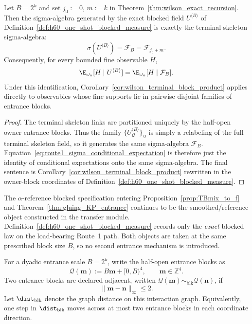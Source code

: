 \begin{proposition}
\label{prop:route1_blocked_sigma_identification}
Let $B=2^k$ and set $j_0:=0$, $m:=k$ in Theorem~\ref{thm:wilson_exact_recursion}.
Then the sigma-algebra generated by the exact blocked field $U^{\langle B\rangle}$ of Definition~\ref{def:h60_one_shot_blocked_measure} is exactly the terminal skeleton sigma-algebra:
\[
\sigma(U^{\langle B\rangle})=\mathcal F_B=\mathcal F_{j_0+m}.
\]
Consequently, for every bounded fine observable $H$,
\begin{equation}\label{eq:route1_sigma_conditional_expectation}
\E_{\omega_a}[H\mid U^{\langle B\rangle}]
=
\E_{\omega_a}[H\mid \mathcal F_B].
\end{equation}
Under this identification, Corollary~\ref{cor:wilson_terminal_block_product} applies directly to observables whose fine supports lie in pairwise disjoint families of entrance blocks.
\end{proposition}

\begin{proof}
The terminal skeleton links are partitioned uniquely by the half-open owner entrance blocks.
Thus the family $\{U^{\langle B\rangle}_{\mathcal Q}\}_{\mathcal Q}$ is simply a relabeling of the full terminal skeleton field, so it generates the same sigma-algebra $\mathcal F_B$.
Equation~\eqref{eq:route1_sigma_conditional_expectation} is therefore just the identity of conditional expectations onto the same sigma-algebra.
The final sentence is Corollary~\ref{cor:wilson_terminal_block_product} rewritten in the owner-block coordinates of Definition~\ref{def:h60_one_shot_blocked_measure}.
\end{proof}

\begin{remark}
The $\alpha$-reference blocked specification entering Proposition~\ref{prop:TBmix_to_f} and Theorem~\ref{thm:gluing_KP_entrance} continues to be the smoothed/reference object constructed in the transfer module.
Definition~\ref{def:h60_one_shot_blocked_measure} records only the \emph{exact} blocked law on the load-bearing Route~1 path.
Both objects are taken at the same prescribed block size $B$, so no second entrance mechanism is introduced.
\end{remark}

\begin{definition}\label{def:route1_block_graph}
For a dyadic entrance scale $B=2^k$, write the half-open entrance blocks as
\[
\mathcal Q(\mathbf m):=B\mathbf m+[0,B)^4,
\qquad \mathbf m\in\mathbb Z^4.
\]
Two entrance blocks are declared adjacent, written $\mathcal Q(\mathbf m)\sim_{\mathrm{blk}}\mathcal Q(\mathbf n)$, if
\[
\|\mathbf m-\mathbf n\|_{\infty}\le 2.
\]
Let $\dist_{\mathrm{blk}}$ denote the graph distance on this interaction graph.
Equivalently, one step in $\dist_{\mathrm{blk}}$ moves across at most two entrance blocks in each coordinate direction.
\end{definition}

